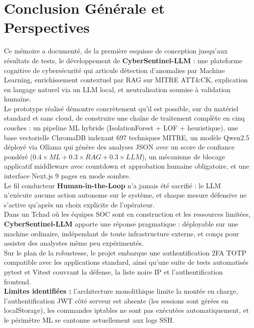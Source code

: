 \documentclass[12pt,a4paper]{report}
\begin{document}
\chapter*{Conclusion Générale et Perspectives}
\begin{onehalfspace}
Ce mémoire a documenté, de la première esquisse de conception jusqu'aux
résultats de tests, le développement de \textbf{CyberSentinel-LLM} : une
plateforme cognitive de cybersécurité qui articule détection d'anomalies
par Machine Learning, enrichissement contextuel par RAG sur MITRE ATT\&CK,
explication en langage naturel via un LLM local, et neutralisation soumise
à validation humaine.\\

Le prototype réalisé démontre concrètement qu'il est possible, sur du
matériel standard et sans cloud, de construire une chaîne de traitement
complète en cinq couches : un pipeline ML hybride (IsolationForest + LOF +
heuristique), une base vectorielle ChromaDB indexant 697 techniques MITRE,
un modèle Qwen2.5 déployé via Ollama qui génère des analyses JSON avec
un score de confiance pondéré ($0.4 \times ML + 0.3 \times RAG + 0.3 \times LLM$),
un mécanisme de blocage applicatif middleware avec countdown et approbation
humaine obligatoire, et une interface Next.js 9 pages en mode sombre.\\

Le fil conducteur \textbf{Human-in-the-Loop} n'a jamais été sacrifié :
le LLM n'exécute aucune action autonome sur le système, et chaque mesure
défensive ne s'active qu'après un choix explicite de l'opérateur.\\

Dans un Tchad où les équipes SOC sont en construction et les ressources
limitées, \textbf{CyberSentinel-LLM} apporte une réponse pragmatique :
déployable sur une machine ordinaire, indépendant de toute infrastructure
externe, et conçu pour assister des analystes même peu expérimentés.\\

Sur le plan de la robustesse, le projet embarque une authentification 2FA
TOTP compatible avec les applications standard, ainsi qu'une suite de
tests automatisés pytest et Vitest couvrant la défense, la liste noire IP
et l'authentification frontend.\\

\textbf{Limites identifiées :} l'architecture monolithique limite la montée
en charge, l'authentification JWT côté serveur est absente (les sessions
sont gérées en localStorage), les commandes iptables ne sont pas exécutées
automatiquement, et le périmètre ML se cantonne actuellement aux logs SSH.\\


\end{onehalfspace}
\end{document}
